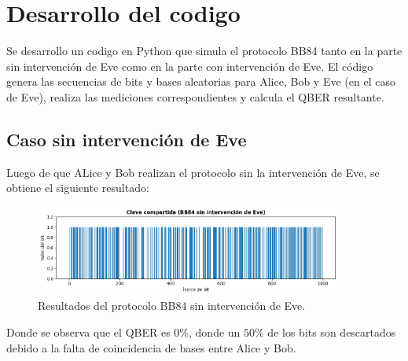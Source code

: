 \documentclass[12pt]{article}
\begin{document}
\section{Desarrollo del codigo}

Se desarrollo un codigo en Python que simula el protocolo BB84 tanto en la parte sin
intervención de Eve como en la parte con intervención de Eve. El código genera las
secuencias de bits y bases aleatorias para Alice, Bob y Eve (en el caso de Eve), 
realiza las mediciones correspondientes y calcula el QBER resultante.

\subsection{Caso sin intervención de Eve}

Luego de que ALice y Bob realizan el protocolo sin la intervención de Eve, se obtiene el siguiente resultado:

\begin{figure}[H]
    \centering
    \includegraphics[width=0.9\textwidth]{caso_1.png}
    \caption{Resultados del protocolo BB84 sin intervención de Eve.}
\end{figure}

Donde se observa que el QBER es $0\%$, donde un $50\%$ de los bits son descartados
debido a la falta de coincidencia de bases entre Alice y Bob.
\end{document}
